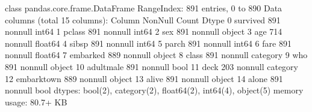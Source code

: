 \documentclass[letterpaper,10pt,english]{jupyterBook}
\begin{document}
\begin{sphinxVerbatim}[commandchars=\\\{\}]
   
   
   
  
\end{sphinxVerbatim}

\begin{sphinxVerbatim}[commandchars=\\\{\}]
\end{sphinxVerbatim}

\begin{sphinxVerbatim}[commandchars=\\\{\}]
\PYGZlt{}class \PYGZsq{}pandas.core.frame.DataFrame\PYGZsq{}\PYGZgt{}
RangeIndex: 891 entries, 0 to 890
Data columns (total 15 columns):
 \PYGZsh{}   Column       Non\PYGZhy{}Null Count  Dtype   
\PYGZhy{}\PYGZhy{}\PYGZhy{}  \PYGZhy{}\PYGZhy{}\PYGZhy{}\PYGZhy{}\PYGZhy{}\PYGZhy{}       \PYGZhy{}\PYGZhy{}\PYGZhy{}\PYGZhy{}\PYGZhy{}\PYGZhy{}\PYGZhy{}\PYGZhy{}\PYGZhy{}\PYGZhy{}\PYGZhy{}\PYGZhy{}\PYGZhy{}\PYGZhy{}  \PYGZhy{}\PYGZhy{}\PYGZhy{}\PYGZhy{}\PYGZhy{}   
 0   survived     891 non\PYGZhy{}null    int64   
 1   pclass       891 non\PYGZhy{}null    int64   
 2   sex          891 non\PYGZhy{}null    object  
 3   age          714 non\PYGZhy{}null    float64 
 4   sibsp        891 non\PYGZhy{}null    int64   
 5   parch        891 non\PYGZhy{}null    int64   
 6   fare         891 non\PYGZhy{}null    float64 
 7   embarked     889 non\PYGZhy{}null    object  
 8   class        891 non\PYGZhy{}null    category
 9   who          891 non\PYGZhy{}null    object  
 10  adult\PYGZus{}male   891 non\PYGZhy{}null    bool    
 11  deck         203 non\PYGZhy{}null    category
 12  embark\PYGZus{}town  889 non\PYGZhy{}null    object  
 13  alive        891 non\PYGZhy{}null    object  
 14  alone        891 non\PYGZhy{}null    bool    
dtypes: bool(2), category(2), float64(2), int64(4), object(5)
memory usage: 80.7+ KB
\end{sphinxVerbatim}
\end{document}
